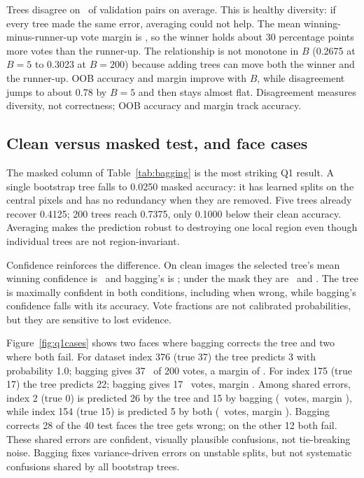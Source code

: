\documentclass[10pt,twocolumn,letterpaper]{article}
\begin{document}
Trees disagree on \BagDis~of validation pairs on average.  This is healthy
diversity: if every tree made the same error, averaging could not help.  The
mean winning-minus-runner-up vote margin is \BagMargin, so the winner holds
about 30 percentage points more votes than the runner-up.  The relationship is
not monotone in $B$ (0.2675 at $B=5$ to 0.3023 at $B=200$) because adding trees
can move both the winner and the runner-up.  OOB accuracy and margin improve
with $B$, while disagreement jumps to about 0.78 by $B=5$ and then stays almost
flat.  Disagreement measures diversity, not correctness; OOB accuracy and
margin track accuracy.

\subsection{Clean versus masked test, and face cases}

The masked column of Table~\ref{tab:bagging} is the most striking Q1 result.  A
single bootstrap tree falls to 0.0250 masked accuracy: it has learned splits on
the central pixels and has no redundancy when they are removed.  Five trees
already recover 0.4125; 200 trees reach 0.7375, only 0.1000 below their clean
accuracy.  Averaging makes the prediction robust to destroying one local region
even though individual trees are not region-invariant.

Confidence reinforces the difference.  On clean images the selected tree's mean
winning confidence is \TreeCleanConf~and bagging's is \BagCleanConf; under the
mask they are \TreeMaskConf~and \BagMaskConf.  The tree is maximally confident
in both conditions, including when wrong, while bagging's confidence falls with
its accuracy.  Vote fractions are not calibrated probabilities, but they are
sensitive to lost evidence.

Figure~\ref{fig:q1cases} shows two faces where bagging corrects the tree and two
where both fail.  For dataset index 376 (true 37) the tree predicts 3 with
probability 1.0; bagging gives 37 \CaseOneVotes~of 200 votes, a margin of
\CaseOneMargin.  For index 175 (true 17) the tree predicts 22; bagging gives 17
\CaseTwoVotes~votes, margin \CaseTwoMargin.  Among shared errors, index 2
(true 0) is predicted 26 by the tree and 15 by bagging
(\CaseThreeVotes~votes, margin \CaseThreeMargin), while index 154 (true 15) is
predicted 5 by both (\CaseFourVotes~votes, margin \CaseFourMargin).  Bagging
corrects 28 of the 40 test faces the tree gets wrong; on the other 12 both fail.
These shared errors are confident, visually plausible confusions, not
tie-breaking noise.  Bagging fixes variance-driven errors on unstable splits,
but not systematic confusions shared by all bootstrap trees.
\end{document}

